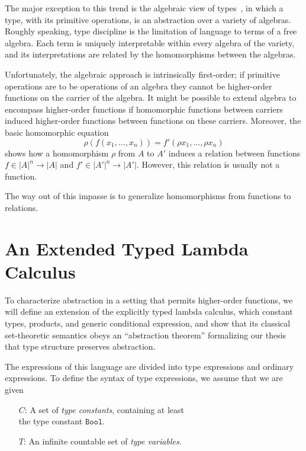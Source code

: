\documentclass[sigplan,screen,nonacm,balance=false]{acmart}
\theoremstyle{plain}
\newcommand{\Bool}{\mathtt{Bool}}
\begin{document}
The major exception to this trend is the algebraic view of types~\citep{ADTs-GH,ADTs-GTW,ADTs-Kapur}, in which a type, with its primitive operations, is an abstraction over a variety of algebras.
Roughly speaking, type discipline is the limitation of language to terms of a free algebra.
Each term is uniquely interpretable within every algebra of the variety, and its interpretations are related by the homomorphisms between the algebras.

Unfortunately, the algebraic approach is intrinsically first-order; if primitive operations are to be operations of an algebra they cannot be higher-order functions on the carrier of the algebra.
It might be possible to extend algebra to encompass higher-order functions if homomorphic functions between carriers induced higher-order functions between functions on these carriers. Moreover, the basic homomorphic equation
%
\begin{equation*}
  \rho(f(x_1, \dots, x_n)) = f'(\rho x_1, \dots, \rho x_n)
\end{equation*}
%
shows how a homomorphism $\rho$ from $A$ to $A'$ induces a relation between functions $f \in |A|^n \to |A|$ and $f' \in |A'|^n \to |A'|$.
However, this relation is usually not a function.

The way out of this impasse is to generalize homomorphisms from functions to relations.

\section{An Extended Typed Lambda Calculus}

To characterize abstraction in a setting that permits higher-order functions, we will define an extension of the explicitly typed lambda calculus, which constant types, products, and generic conditional expression, and show that its classical set-theoretic semantics obeys an ``abstraction theorem'' formalizing our thesis that type structure preserves abstraction.

The expressions of this language are divided into type expressions and ordinary expressions.
To define the syntax of type expressions, we assume that we are given

\begin{itemize}[noitemsep,leftmargin=3em]
  \item[$C$:] A set of \emph{type constants}, containing at least \\
    the type constant $\Bool$.
  \item[$T$:] An infinite countable set of \emph{type variables}.
\end{itemize}
\end{document}
